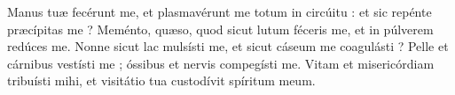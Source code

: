 
Manus tuæ fecérunt me, et plasmavérunt me totum in circúitu : et sic repénte præcípitas me ?
Meménto, quæso, quod sicut lutum féceris me, et in púlverem redúces me.
Nonne sicut lac mulsísti me, et sicut cáseum me coagulásti ?
Pelle et cárnibus vestísti me ; óssibus et nervis compegísti me.
Vitam et misericórdiam tribuísti mihi, et visitátio tua custodívit spíritum meum.
